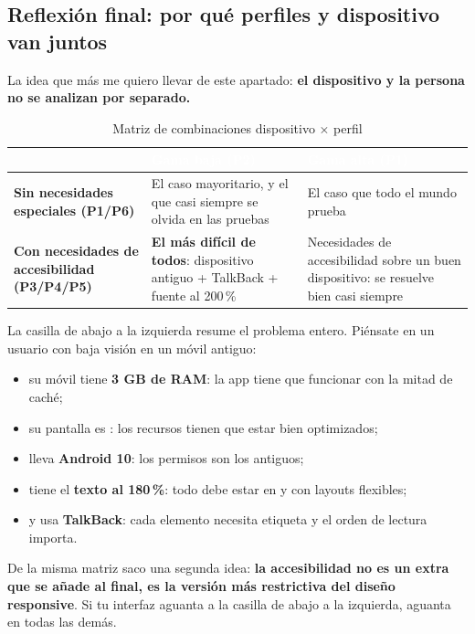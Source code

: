 \subsection{Reflexión final: por qué perfiles y dispositivo van juntos}

La idea que más me quiero llevar de este apartado: \textbf{el dispositivo y la persona no se analizan por separado.}

\begin{table}[htbp]
\centering
\begin{tabularx}{\textwidth}{@{}>{\RaggedRight\arraybackslash}p{3.3cm} >{\RaggedRight\arraybackslash}X >{\RaggedRight\arraybackslash}X@{}}
\toprule
\rowcolor{primary}
\textcolor{white}{\sffamily\bfseries} & \textcolor{white}{\sffamily\bfseries Gama baja (P2)} & \textcolor{white}{\sffamily\bfseries Gama alta (P1)} \\
\midrule
\textbf{Sin necesidades especiales (P1/P6)} & El caso mayoritario, y el que casi siempre se olvida en las pruebas & El caso que todo el mundo prueba \\
\rowcolor{soft}
\textbf{Con necesidades de accesibilidad (P3/P4/P5)} & \textbf{El más difícil de todos}: dispositivo antiguo + TalkBack + fuente al 200\,\% & Necesidades de accesibilidad sobre un buen dispositivo: se resuelve bien casi siempre \\
\bottomrule
\end{tabularx}
\caption{Matriz de combinaciones dispositivo $\times$ perfil}
\end{table}

La casilla de abajo a la izquierda resume el problema entero. Piénsate en un usuario con baja visión en un móvil antiguo:
\begin{itemize}[leftmargin=*,itemsep=0.15em]
  \item su móvil tiene \textbf{3 GB de RAM}: la app tiene que funcionar con la mitad de caché;
  \item su pantalla es : los recursos tienen que estar bien optimizados;
  \item lleva \textbf{Android 10}: los permisos son los antiguos;
  \item tiene el \textbf{texto al 180\,\%}: todo debe estar en  y con layouts flexibles;
  \item y usa \textbf{TalkBack}: cada elemento necesita etiqueta y el orden de lectura importa.
\end{itemize}

De la misma matriz saco una segunda idea: \textbf{la accesibilidad no es un extra que se añade al final, es la versión más restrictiva del diseño responsive}. Si tu interfaz aguanta a la casilla de abajo a la izquierda, aguanta en todas las demás.

